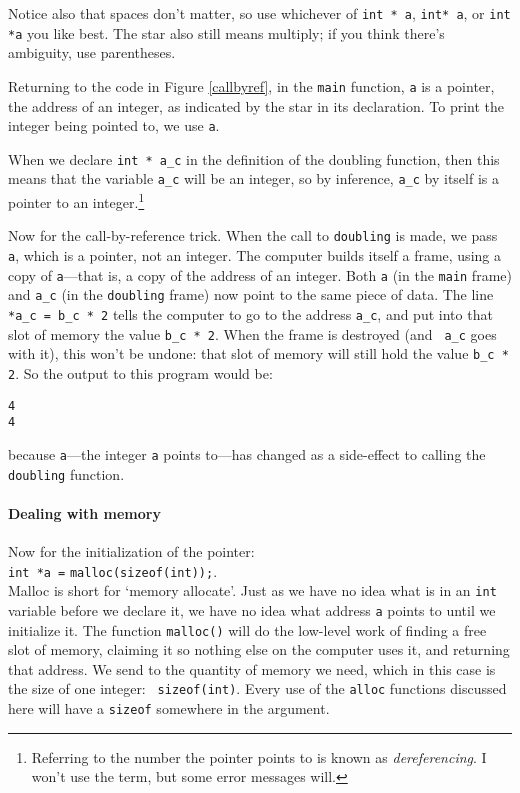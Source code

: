 \documentclass[12pt]{article}
\makeatletter
\def\ttind#1{\index{#1@{\tt #1}}{\tt #1}}
\def\ttindex#1{\index{#1@{\tt #1}}}
\makeatother
\begin{document}
Notice also that spaces don't matter, so use whichever of {\tt int *
a}, {\tt int* a}, or {\tt int *a} you like best. The star also still means multiply; if you think
there's ambiguity, use parentheses.

Returning to the code in Figure \ref{callbyref}, in the {\tt main} function, {\tt a} is a pointer,
the address of an integer, as indicated by the star in its
declaration. To print the integer being pointed to, we use {\tt *a}. 

When we declare {\tt int * a\_c} in the definition of the doubling
function, then this means that the variable {\tt *a\_c} will be an
integer, so by inference, {\tt a\_c} by itself is a pointer to an
integer.\footnote{Referring to the number the pointer points to is
known as {\sl dereferencing}. I won't use the term, but some error
messages will.}

Now for the call-by-reference trick.
When the call to {\tt doubling} is made, we pass {\tt a}, which is a
pointer, not an integer. The computer builds itself a frame, using a copy
of {\tt a}---that is, a copy of the address of an integer. Both {\tt a} (in the {\tt main} frame) 
and {\tt a\_c} (in the {\tt doubling} frame) now point to the same piece of data.
The line {\tt
*a\_c = b\_c * 2} tells the computer to go to the address {\tt a\_c}, and put into that slot of
memory the value {\tt b\_c * 2}. When the frame is destroyed (and {\tt
a\_c} goes with it), this won't be undone: that slot of memory will still
hold the value {\tt b\_c * 2}.  So the output to this program would be:
\begin{verbatim} 
4 
4 
\end{verbatim} 
because {\tt *a}---the integer {\tt a} points to---has changed as a
side-effect to calling the {\tt doubling} function.

\paragraph{Dealing with memory} Now for the initialization of the pointer:\\ 
{\tt int *a =} {\tt malloc(sizeof(int));}.\\
Malloc is short for `memory allocate'. Just as we have no idea what
is in an {\tt int} variable before we declare it, we have no idea what address {\tt a} points to until we
initialize it. The function {\tt malloc()} will do the low-level work of finding a free slot of memory,
claiming it so nothing else on the computer uses it, and returning that address. We send to \ttind{malloc}
the quantity of memory we need, which in this case is the size of one integer: {\tt
sizeof(int)}. Every use of the {\tt *alloc} functions discussed here will have a {\tt sizeof} somewhere in
the argument.\ttindex{sizeof}
\end{document}
